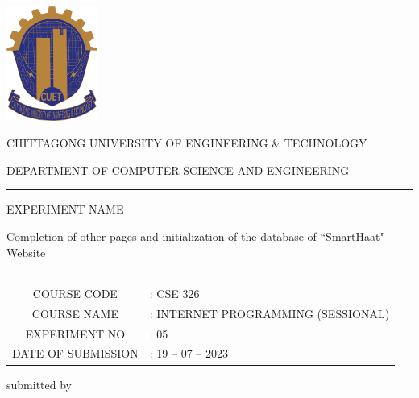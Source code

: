 \documentclass[a4paper,12pt]{report}
\begin{document}
\begin{titlepage}

	\centering

	\includegraphics[width=3cm, keepaspectratio]{cuet.png} \par \vspace{0.5cm}
	\begin{Large}
		CHITTAGONG UNIVERSITY OF ENGINEERING \& TECHNOLOGY
	\end{Large}
	\par
	\vspace{.5cm}
	{DEPARTMENT OF COMPUTER SCIENCE AND ENGINEERING}
\vspace{1cm}

	\raisebox{-\baselineskip}{\rule{\textwidth}{1px}}
	\rule{\textwidth}{1px}

\vspace{0.2cm}
{\large{{EXPERIMENT NAME}}}\par \vspace{0.3cm}
\Large{{Completion of other pages and initialization of the database of ``SmartHaat" Website}}
	\rule{\textwidth}{2px}

\vspace{0.5cm}

	\normalsize
\begin{tabular}{cl}
COURSE CODE        & : CSE 326                          \\
COURSE NAME        & : INTERNET PROGRAMMING (SESSIONAL) \\
EXPERIMENT NO      & : 05                               \\
DATE OF SUBMISSION & : 19 -- 07 -- 2023
\end{tabular}
\vspace{0.5cm}

	\parbox[l]{9cm}{
		\begin{center}
			submitted by
		\end{center}

}
\end{titlepage}
\end{document}

